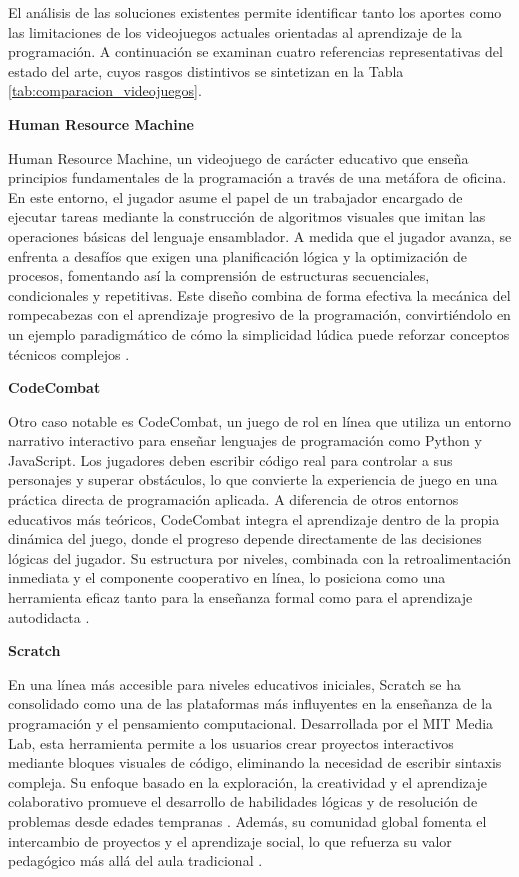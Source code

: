 El análisis de las soluciones existentes permite identificar tanto los aportes como las limitaciones de los videojuegos actuales orientadas al aprendizaje de la programación. A continuación se examinan cuatro referencias representativas del estado del arte, cuyos rasgos distintivos se sintetizan en la Tabla \ref{tab:comparacion_videojuegos}.

\textbf{Human Resource Machine}

Human Resource Machine, un videojuego de carácter educativo que enseña principios fundamentales de la programación a través de una metáfora de oficina. En este entorno, el jugador asume el papel de un trabajador encargado de ejecutar tareas mediante la construcción de algoritmos visuales que imitan las operaciones básicas del lenguaje ensamblador. A medida que el jugador avanza, se enfrenta a desafíos que exigen una planificación lógica y la optimización de procesos, fomentando así la comprensión de estructuras secuenciales, condicionales y repetitivas. Este diseño combina de forma efectiva la mecánica del rompecabezas con el aprendizaje progresivo de la programación, convirtiéndolo en un ejemplo paradigmático de cómo la simplicidad lúdica puede reforzar conceptos técnicos complejos \cite{Zhang_Wong_Chan_2023, heithausen_look_nodate}.


\textbf{CodeCombat}

Otro caso notable es CodeCombat, un juego de rol en línea que utiliza un entorno narrativo interactivo para enseñar lenguajes de programación como Python y JavaScript. Los jugadores deben escribir código real para controlar a sus personajes y superar obstáculos, lo que convierte la experiencia de juego en una práctica directa de programación aplicada. A diferencia de otros entornos educativos más teóricos, CodeCombat integra el aprendizaje dentro de la propia dinámica del juego, donde el progreso depende directamente de las decisiones lógicas del jugador. Su estructura por niveles, combinada con la retroalimentación inmediata y el componente cooperativo en línea, lo posiciona como una herramienta eficaz tanto para la enseñanza formal como para el aprendizaje autodidacta \cite{Zhang_Wong_Chan_2023}.


\textbf{Scratch}

En una línea más accesible para niveles educativos iniciales, Scratch se ha consolidado como una de las plataformas más influyentes en la enseñanza de la programación y el pensamiento computacional. Desarrollada por el MIT Media Lab, esta herramienta permite a los usuarios crear proyectos interactivos mediante bloques visuales de código, eliminando la necesidad de escribir sintaxis compleja. Su enfoque basado en la exploración, la creatividad y el aprendizaje colaborativo promueve el desarrollo de habilidades lógicas y de resolución de problemas desde edades tempranas \cite{maloney_scratch_2010}. Además, su comunidad global fomenta el intercambio de proyectos y el aprendizaje social, lo que refuerza su valor pedagógico más allá del aula tradicional \cite{velasco-ramirez_impacto_2023,maloney_scratch_2010}.


